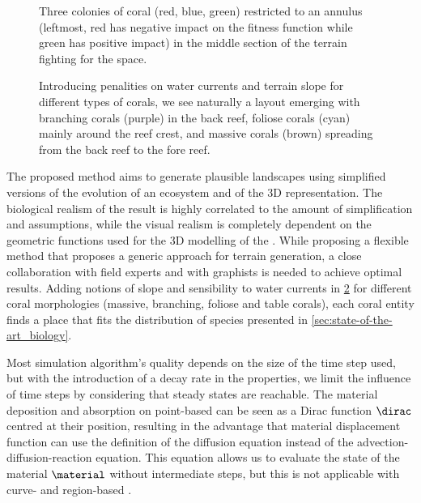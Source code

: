 \begin{figure}
    \caption{Three colonies of coral (red, blue, green) restricted to an annulus (leftmost, red has negative impact on the fitness function while green has positive impact) in the middle section of the terrain fighting for the space.}
    \label{fig:env-obj-coral-colonization-scene}
\end{figure}

\begin{figure}
    \caption{Introducing penalities on water currents and terrain slope for different types of corals, we see naturally a layout emerging with branching corals (purple) in the back reef, foliose corals (cyan) mainly around the reef crest, and massive corals (brown) spreading from the back reef to the fore reef. }
    \label{fig:env-obj-coral-layout}
\end{figure}

The proposed method aims to generate plausible landscapes using simplified versions of the evolution of an ecosystem and of the 3D representation. The biological realism of the result is highly correlated to the amount of simplification and assumptions, while the visual realism is completely dependent on the geometric functions used for the 3D modelling of the . While proposing a flexible method that proposes a generic approach for terrain generation, a close collaboration with field experts and with graphists is needed to achieve optimal results. Adding notions of slope and sensibility to water currents in \cref{fig:env-obj-coral-layout} for different coral morphologies (massive, branching, foliose and table corals), each coral entity finds a place that fits the distribution of species presented in \cref{sec:state-of-the-art_biology}. 

Most simulation algorithm's quality depends on the size of the time step used, but with the introduction of a decay rate in the  properties, we limit the influence of time steps by considering that steady states are reachable. The material deposition and absorption on point-based  can be seen as a Dirac function $\dirac$ centred at their position, resulting in the advantage that material displacement function can use the definition of the diffusion equation instead of the advection-diffusion-reaction equation. This equation allows us to evaluate the state of the material $\material$ without intermediate steps, but this is not applicable with curve- and region-based .


